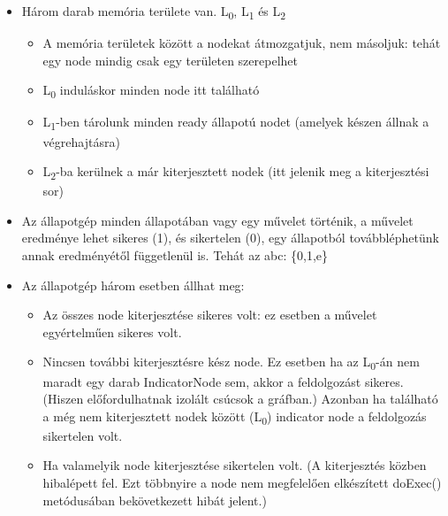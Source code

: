 \documentclass[a4paper,12pt,oneside]{report}
\begin{document}
\begin{itemize}
	\itemsep0em
	\item Három darab memória területe van. L\textsubscript{0}, L\textsubscript{1} és L\textsubscript{2} 			\begin{itemize}
			\itemsep0em
			\item A memória területek között a nodekat átmozgatjuk, nem másoljuk: tehát egy node mindig csak egy területen szerepelhet
			\item L\textsubscript{0} induláskor minden node itt található
			\item L\textsubscript{1}-ben tárolunk minden ready állapotú nodet (amelyek készen állnak a végrehajtásra)
			\item L\textsubscript{2}-ba kerülnek a már kiterjesztett nodek (itt jelenik meg a kiterjesztési sor)
		\end{itemize}
		
	\item Az állapotgép minden állapotában vagy egy művelet történik, a művelet eredménye lehet sikeres (1), és sikertelen (0), egy állapotból továbbléphetünk annak eredményétől függetlenül is. Tehát az abc: \{0,1,e\}
	\item Az állapotgép három esetben állhat meg:
			\begin{itemize}
			\itemsep0em
			\item Az összes node kiterjesztése sikeres volt: ez esetben a művelet egyértelműen sikeres volt.
			\item Nincsen további kiterjesztésre kész node. Ez esetben ha az L\textsubscript{0}-án nem maradt egy darab IndicatorNode sem, akkor a feldolgozást sikeres. (Hiszen előfordulhatnak izolált csúcsok a gráfban.) Azonban ha található a még nem kiterjesztett nodek között (L\textsubscript{0}) indicator node a feldolgozás sikertelen volt.
			\item Ha valamelyik node kiterjesztése sikertelen volt. (A kiterjesztés közben hibalépett fel. Ezt többnyire a node nem megfelelően elkészített doExec() metódusában bekövetkezett hibát jelent.)

		\end{itemize}

\end{itemize}
\end{document}
